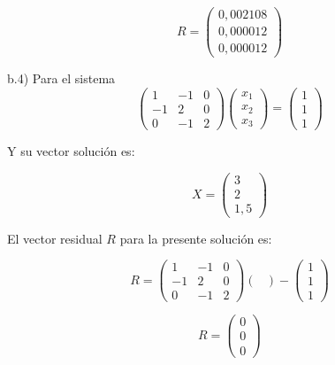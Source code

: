 \begin{equation*}
    R=
    \begin{pmatrix}
        0,002108 \\
        0,000012 \\
        0,000012
    \end{pmatrix}
\end{equation*}

b.4) Para el sistema
\begin{equation*}
    \begin{pmatrix}
        1 & -1 & 0 \\
        -1 & 2 & 0 \\
        0 & -1 & 2
    \end{pmatrix}
    \begin{pmatrix}
        x_1 \\
        x_2 \\
        x_3
    \end{pmatrix}    
    =    
    \begin{pmatrix}
        1 \\
        1 \\
        1
    \end{pmatrix}
\end{equation*}

Y su vector solución es:

\begin{equation*}
    X=
    \begin{pmatrix}
        3 \\
        2 \\
        1,5
    \end{pmatrix}    
\end{equation*}

El vector residual $R$ para la presente solución es:

\begin{equation*}
    R=
    \begin{pmatrix}
        1 & -1 & 0 \\
        -1 & 2 & 0 \\
        0 & -1 & 2
    \end{pmatrix}
    \begin{pmatrix}
        
    \end{pmatrix}    
    -   
    \begin{pmatrix}
        1 \\
        1 \\
        1
    \end{pmatrix}
\end{equation*}

\begin{equation*}
    R=
    \begin{pmatrix}
        0 \\
        0 \\
        0
    \end{pmatrix}
\end{equation*}
